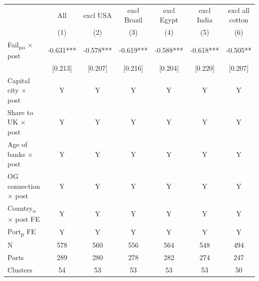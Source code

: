 {
\def\sym#1{\ifmmode^{#1}\else\(^{#1}\)\fi}
\begin{tabular}{l*{6}{c}}
\toprule
            &         All   &    excl USA   & excl Brazil   &  excl Egypt   &  excl India   &excl all cotton   \\
            &\multicolumn{1}{c}{(1)}   &\multicolumn{1}{c}{(2)}   &\multicolumn{1}{c}{(3)}   &\multicolumn{1}{c}{(4)}   &\multicolumn{1}{c}{(5)}   &\multicolumn{1}{c}{(6)}   \\
\midrule
Fail\textsubscript{po} $\times$ post&      -0.631***&      -0.578***&      -0.619***&      -0.588***&      -0.618***&      -0.505** \\
            &     [0.213]   &     [0.207]   &     [0.216]   &     [0.204]   &     [0.220]   &     [0.207]   \\
Capital city $\times$ post &           Y   &           Y   &           Y   &           Y   &           Y   &           Y   \\
Share to UK $\times$ post &           Y   &           Y   &           Y   &           Y   &           Y   &           Y   \\
Age of banks $\times$ post&           Y   &           Y   &           Y   &           Y   &           Y   &           Y   \\
OG connection $\times$ post&           Y   &           Y   &           Y   &           Y   &           Y   &           Y   \\
Country\textsubscript{o} $\times$ post FE&           Y   &           Y   &           Y   &           Y   &           Y   &           Y   \\
Port\textsubscript{p} FE &           Y   &           Y   &           Y   &           Y   &           Y   &           Y   \\
\midrule
N           &         578   &         560   &         556   &         564   &         548   &         494   \\
Ports       &         289   &         280   &         278   &         282   &         274   &         247   \\
Clusters    &          54   &          53   &          53   &          53   &          53   &          50   \\
\bottomrule
\end{tabular}
}
